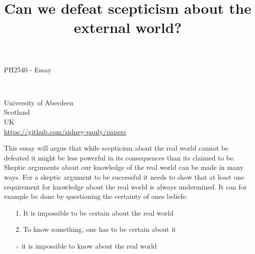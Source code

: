 \documentclass[14pt]{article}
\begin{document}
\title{Can we defeat scepticism about the external world?}
\date{}



\fancyhf{}


\begin{titlepage}
  \begin{center}
    \Large
    \textbf{\thetitle}
        
    \vspace{0.4cm}
    \large
    PH2540 - Essay
        
    \vspace{0.4cm}
    \textbf{\theauthor}\\
    \textbf{\theuoastudentid}


  \end{center}


  \vfill

  \begin{center}

    University of Aberdeen\\
    Scotland\\
    UK\\
    \thedate
    \vspace{0.4cm}
    \url{https://github.com/sidney-pauly/papers}
  \end{center}
\end{titlepage}

This essay will argue that while scepticism about the real world cannot be defeated it
might be less powerful in its consequences than its claimed to be. 
\\

Skeptic arguments about our knowledge of the real world can be made in many ways. For a skeptic argument to
be successful it needs to show that at least one requirement for knowledge about the real world is always undermined.
It can for example be done by questioning the certainty of ones beliefs\autocite[p. 135]{lemos_2007}:

\begin{itemize}
  \item[1.] It is impossible to be certain about the real world
  \item[2.] To know something, one has to be certain about it
  \item[$\therefore$] it is impossible to know about the real world
\end{itemize}
\end{document}
